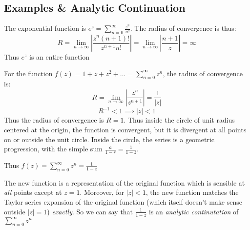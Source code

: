 \documentclass[12pt, letterpaper]{book}
\begin{document}
\subsection{Examples \& Analytic Continuation}

The exponential function is $e^z= \sum_{n=0}^{\infty} \frac{z^n}{n!}$. The radius of convergence is thus: 
\[ R= \lim_{n\to\infty} \left|\frac{z^n (n+1)!}{z^{n+1}n!}\right|=  \lim_{n\to\infty} \left|\frac{n+1}{z}\right|= \infty\]
Thus $e^z$ is an entire function

For the function $f(z)= 1+ z+ z^2+\dots= \sum_{n=0}^{\infty}z^n$, the radius of convergence is: 
\[R= \lim_{n\to\infty} \left|\frac{z^n}{z^{n+1}}\right|= \frac{1}{|z|}\]
\[R^{-1}<1\implies |z|<1\] 
Thus the radius of convergence is $R= 1$. Thus inside the circle of unit radius centered at the origin, the function is convergent, but it is divergent at all points on or outside the unit circle. Inside the circle, the series is a geometric progression, with the simple sum $\frac{a}{1-r}= \frac{1}{1-z}$. 

Thus $f(z)= \sum_{n=0}^{\infty}z^n= \frac{1}{1-z}$

The new function is a representation of the original function which is sensible at \emph{all} points except at $z= 1$. Moreover, for $|z|<1$, the new function matches the Taylor series expansion of the original function (which itself doesn't make sense outside $|z|=1$) \emph{exactly}. So we can say that $\frac{1}{1-z}$ is an \emph{analytic continutation} of $\sum_{n=0}^{\infty}z^n$
\end{document}
